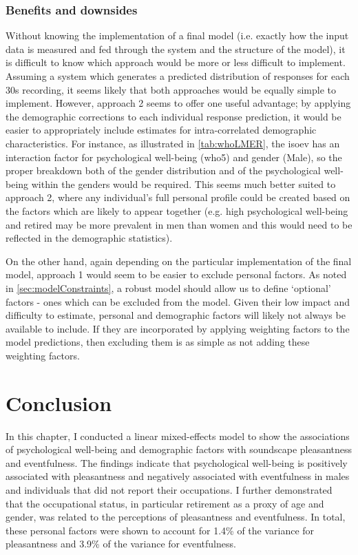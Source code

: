 \subsubsection{Benefits and downsides}
Without knowing the implementation of a final model (i.e. exactly how the input data is measured and fed through the system and the structure of the model), it is difficult to know which approach would be more or less difficult to implement. Assuming a system which generates a predicted distribution of responses for each 30s recording, it seems likely that both approaches would be equally simple to implement. However, approach 2 seems to offer one useful advantage; by applying the demographic corrections to each individual response prediction, it would be easier to appropriately include estimates for intra-correlated demographic characteristics. For instance, as illustrated in \cref{tab:whoLMER}, the \gls{isoev} has an interaction factor for psychological well-being (\gls{who5}) and gender (Male), so the proper breakdown both of the gender distribution and of the psychological well-being within the genders would be required. This seems much better suited to approach 2, where any individual's full personal profile could be created based on the factors which are likely to appear together (e.g. high psychological well-being and retired may be more prevalent in men than women and this would need to be reflected in the demographic statistics). 

On the other hand, again depending on the particular implementation of the final model, approach 1 would seem to be easier to exclude personal factors. As noted in \cref{sec:modelConstraints}, a robust model should allow us to define `optional' factors - ones which can be excluded from the model. Given their low impact and difficulty to estimate, personal and demographic factors will likely not always be available to include. If they are incorporated by applying weighting factors to the model predictions, then excluding them is as simple as not adding these weighting factors. 

\section{Conclusion}
In this chapter, I conducted a linear mixed-effects model to show the associations of psychological well-being and demographic factors with soundscape pleasantness and eventfulness. The findings indicate that psychological well-being is positively associated with pleasantness and negatively associated with eventfulness in males and individuals that did not report their occupations. I further demonstrated that the occupational status, in particular retirement as a proxy of age and gender, was related to the perceptions of pleasantness and eventfulness. In total, these personal factors were shown to account for 1.4\% of the variance for pleasantness and 3.9\% of the variance for eventfulness. 

